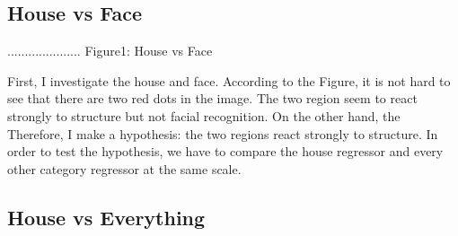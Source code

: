 \documentclass[11pt]{article}
\begin{document}
\subsection{House vs Face}

\begin{housevsface}
  \centering
    \caption{..................... Figure1: House vs Face}
           
           
First, I investigate the house and face.
According to the Figure, it is not hard to see that there are two red dots in the image. The two region  seem to react strongly to structure but not facial recognition. On the other hand, the  Therefore, I make a hypothesis: the two regions react strongly to structure. In order to test the hypothesis, we have to compare the house regressor and every other category regressor at the same scale. 
\end{housevsface}


\subsection{House vs Everything}
\end{document}
